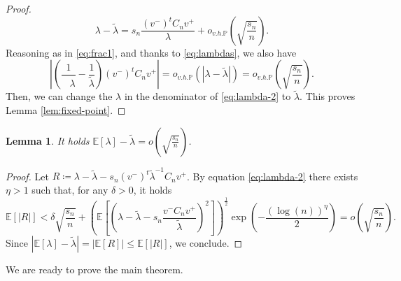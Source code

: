\documentclass[11pt,oneside]{amsart}
\theoremstyle{plain}
\newtheorem{lemma}[theorem]{Lemma}
\numberwithin{equation}{section}
\newcommand{\E}{\mathbb{E}}
\newcommand{\p}{\mathbb{P}}
\newcommand{\centered}{C_n}
\newcommand{\scaling}{s_n}
\newcommand{\ohp}{o_{v.h.\p}}
\begin{document}
\begin{proof}
\begin{equation}
        \lambda -\tilde{\lambda}=\scaling\frac{(v^-)^t \centered v^+}{\lambda}+\ohp\left(\sqrt{\frac{\scaling}{n}}\right).
    \end{equation}
 Reasoning as in \eqref{eq:frac1}, and thanks to \eqref{eq:lambdas}, we also have 
 \begin{equation}
     \left|\left(\frac{1}{\phantom{\tilde\lambda} \!\!\!\!\!\ \lambda}-\frac{1}{\tilde\lambda}\right)(v^-)^t \centered v^+\right| = \ohp(|\lambda-\tilde\lambda|)=\ohp\left(\sqrt{\frac{\scaling}{n}}\right).
 \end{equation} 
Then, we can change the $\lambda$ in the denominator of \eqref{eq:lambda-2} to $\tilde \lambda$. This proves Lemma \ref{lem:fixed-point}.
\end{proof}

\begin{lemma} \label{lem:R}
    It holds $\E[\lambda]-\tilde\lambda = o\left(\sqrt{\frac{\scaling}{n}}\right)$.
\end{lemma}
\begin{proof}
Let $R \coloneq \lambda- \tilde\lambda - \scaling (v^-)^t {\tilde\lambda}^{-1}\centered v^+$. 
By equation \eqref{eq:lambda-2} there exists $\eta>1$ such that, for any $\delta>0$, it holds 
\begin{equation}
    \E[|R|] < \delta \sqrt{\frac{\scaling}{n}}+\left(\E\!\left[\left(\lambda-\tilde\lambda-\scaling\frac{v^- \centered v^+}{\tilde\lambda}\right)^2\right]\right)^{\frac12} \!\!\!\!
    \exp{\left({-\frac{(\log(n))^{\eta}}{2}}\right)}=o\left(\sqrt{\frac{\scaling}{n}}\right).
\end{equation}
Since $|\E[\lambda]-\tilde\lambda|=|\E[R]|\le\E[|R|]$, we conclude.
\end{proof}
We are ready to prove the main theorem.
\end{document}
